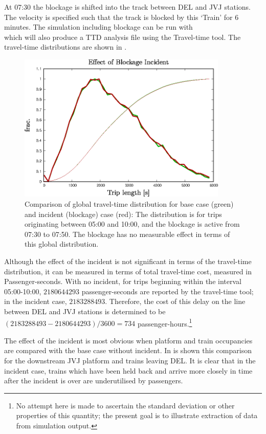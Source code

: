 At 07:30 the blockage is shifted into the track between DEL and JVJ stations.
The velocity is specified such that the track is blocked by this `Train' for 6 minutes.
The simulation including blockage can be run with
 \\
which will also produce a TTD analysis file using the Travel-time tool.
The travel-time distributions are shown in .
\begin{figure}[!ht]
  \centering
  \includegraphics[angle=0,width=10cm]{90_figs/_TTD_incident_comparison.eps}
  \caption{Comparison of global travel-time distribution for base case (green) and incident (blockage) case (red):
  The distribution is for trips originating between 05:00 and 10:00, and the blockage is active from
  07:30 to 07:50. The blockage has no measurable effect in terms of this global distribution.}  
  \label{TTD_comparison}
\end{figure}

Although the effect of the incident is not significant in terms of the
travel-time distribution, it can be measured in terms of total
travel-time cost, measured in Passenger-seconds. With no incident, for
trips beginning within the interval 05:00-10:00, $2180644293$
passenger-seconds are reported by the travel-time tool; in the
incident case, $2183288493$. Therefore, the cost of this delay on the
line between DEL and JVJ stations is determined to be $(2183288493 -
2180644293)/3600 = 734$ passenger-hours.\footnote{No attempt here is
made to ascertain the standard deviation or other properties of this quantity; the present
goal is to illustrate extraction of data from simulation output.}

The effect of the incident is most obvious when platform and train
occupancies are compared with the base case without
incident. In  is shown this comparison for the
downstream JVJ platform and trains leaving DEL. It is clear that in
the incident case, trains which have been held back and arrive more
closely in time after the incident is over are underutilised by
passengers.

